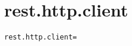 \section{rest.http.client}
\label{configuration:RestHttpClient}
\AvailableInCsharpOnly{\TODO}
\begin{lstlisting}[style=Props,caption={Usage example for \textit{rest.http.client}}]
rest.http.client=
\end{lstlisting}
